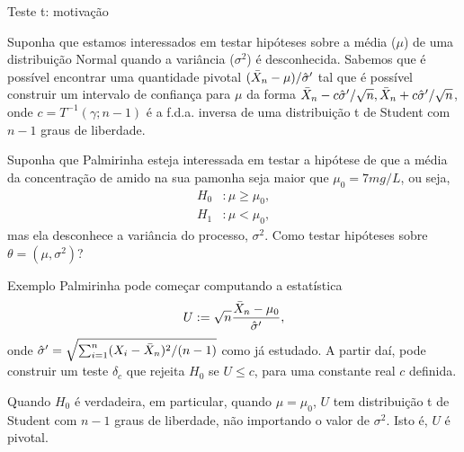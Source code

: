 \begin{frame}{Teste t: motivação}

 Suponha que estamos interessados em testar hipóteses sobre a média ($\mu$) de uma distribuição Normal quando a variância ($\sigma^2$) é desconhecida.
 Sabemos que é possível encontrar uma quantidade pivotal $(\bar{X}_n-\mu)/\hat{\sigma}^\prime$ tal que é possível construir um intervalo de confiança para $\mu$ da forma $\bar{X}_n - c\hat{\sigma}^\prime/\sqrt{n}, \bar{X}_n + c\hat{\sigma}^\prime/\sqrt{n}$, onde $c = T^{-1}(\gamma; n-1)$ é a f.d.a. inversa de uma distribuição t de Student com $n-1$ graus de liberdade.
 
 \begin{pergunta}
  Suponha que Palmirinha esteja interessada em testar a hipótese de que a média da concentração de amido na sua pamonha seja maior que $\mu_0 = 7 mg/L$, ou seja,
    \begin{align*}
   H_0 &: \mu \geq \mu_0, \\
   H_1&:  \mu < \mu_0,
  \end{align*}
  mas ela desconhece a variância do processo, $\sigma^2$.
  Como testar hipóteses sobre $\theta = (\mu, \sigma^2)$?
 \end{pergunta} 
\end{frame}

\begin{frame}{Exemplo}
 Palmirinha pode começar computando a estatística 
 \begin{equation*}
  U:= \sqrt{n}\frac{\bar{X}_n-\mu_0}{\hat{\sigma}^\prime},
 \end{equation*}
onde $\hat{\sigma}^\prime = \sqrt{\sum_{i=1}^n (X_i - \bar{X}_n)^2/(n-1)}$ como já estudado.
A partir daí, pode construir um teste $\delta_c$ que rejeita $H_0$ se $U \leq c$, para uma constante real $c$ definida.
\begin{obs}
 Quando $H_0$ é verdadeira, em particular, quando $\mu = \mu_0$, $U$ tem distribuição t de Student com $n-1$ graus de liberdade, não importando o valor de $\sigma^2$.
 Isto é, $U$ é pivotal.
\end{obs}
\end{frame}


